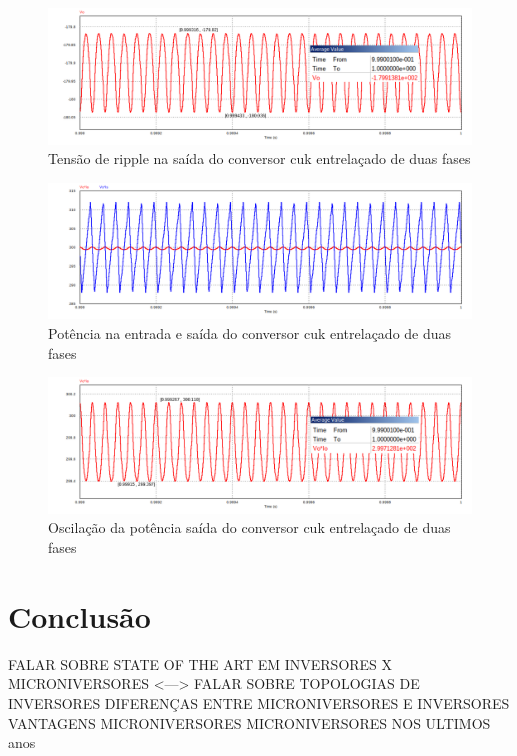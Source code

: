 \documentclass[
	12pt,				%
	openright,			%
	onseside,
	a4paper,			%
	english,			%
	french,				%
	spanish,			%
	brazil,				%
	]{abntex2}
\begin{document}
\begin{figure}[htbp]%
	\centering
		\includegraphics[width=0.8 \linewidth]{cuk_inter_ripp_V_out}
		\caption{Tensão de ripple na saída do conversor cuk entrelaçado de duas fases}
		\label{fig:cuk_inter_ripp_V_out}
\end{figure}

\begin{figure}[htbp]%
	\centering
		\includegraphics[width=0.8 \linewidth]{cuk_inter_power_sign}
		\caption{Potência na entrada e saída do conversor cuk entrelaçado de duas fases}
		\label{fig:cuk_inter_power_sign}
\end{figure}

\begin{figure}[htbp]%
	\centering
		\includegraphics[width=0.8 \linewidth]{cuk_inter_pow_out}
		\caption{Oscilação da potência saída do conversor cuk entrelaçado de duas fases}
		\label{fig:cuk_inter_power_sign_out}
\end{figure}


\chapter{Conclusão}

FALAR SOBRE  STATE OF THE ART EM INVERSORES X MICRONIVERSORES <---> FALAR SOBRE TOPOLOGIAS DE INVERSORES
DIFERENÇAS ENTRE MICRONIVERSORES E INVERSORES
VANTAGENS MICRONIVERSORES
MICRONIVERSORES NOS ULTIMOS anos
\end{document}
